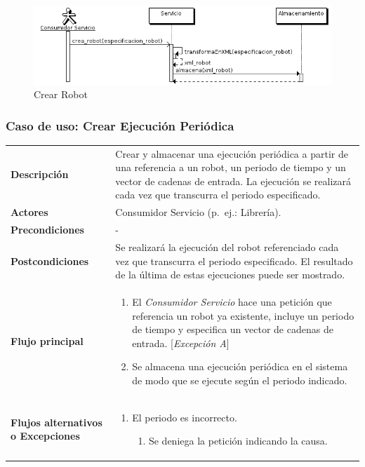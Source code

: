 \begin{figure}[bp!]
  \includegraphics[width=1\textwidth]{chapters/technical-manual/diagrams/sequence/crear_robot.png}
\caption{Crear Robot}
\end{figure}
\clearpage
\subsubsection{\large{Caso de uso: Crear Ejecución Periódica}}

\begin{tabular}[h]{ p{ } p{ }}

\textbf{Descripción} & Crear y almacenar una ejecución periódica a
partir de una referencia a un robot, un periodo de tiempo y un vector
de cadenas de entrada. La ejecución se realizará cada vez que
transcurra el periodo especificado. \\[3mm]

\textbf{Actores} & Consumidor Servicio (p.~ej.: Librería).\\[3mm]

\textbf{Precondiciones} & - \\[3mm]

\textbf{Postcondiciones} & Se realizará la ejecución del robot
referenciado cada vez que transcurra el periodo especificado. El
resultado de la última de estas ejecuciones puede ser mostrado.\\[3mm]

\textbf{Flujo principal} & \begin{enumerate}[leftmargin=1em,topsep=0pt, partopsep=0pt]
  \item El \emph{Consumidor Servicio} hace una petición que referencia
    un robot ya existente, incluye un periodo de tiempo y especifica
    un vector de cadenas de entrada. [\emph{Excepción A}]
  \item Se almacena una ejecución periódica en el sistema de modo que
    se ejecute según el periodo indicado.
\end{enumerate}\\[3mm]

\textbf{Flujos alternativos o Excepciones} &
\begin{enumerate}[label=\Alph*:,leftmargin=1em,topsep=0pt, partopsep=0pt]
\item El periodo es incorrecto.
  \begin{enumerate}[label=\arabic*.,topsep=0pt, partopsep=0pt]
    \item Se deniega la petición indicando la causa.
  \end{enumerate}
\end{enumerate}\\[3mm]
\end{tabular}

